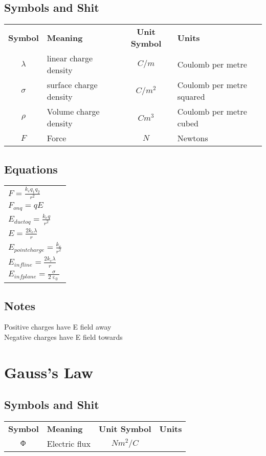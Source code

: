 \documentclass[12pt, letterpaper, twoside]{article}
\begin{document}
  \subsection*{Symbols and Shit}
    \begin{tabular}{c l c l}
  	  \textbf{Symbol} & \textbf{Meaning} & \textbf{Unit Symbol} & \textbf{Units}\\
  	  $\lambda$ & linear charge density & $C/m$ & Coulomb per metre\\
  	  $\sigma$ & surface charge density & $C/m^2$ & Coulomb per metre squared\\
  	  $\rho$ & Volume charge density & $Cm^3$ & Coulomb per metre cubed\\
  	  $F$ & Force & $N$ & Newtons\\
    \end{tabular}
  
  \subsection*{Equations}
    \begin{tabular}{l}
      $F = \frac{k_e q_1 q_2}{r^2}$\\
      $F_{on q} = qE$\\
      $E_{due to q} = \frac{k_e q}{r^2}$\\
      $E = \frac{2k_e \lambda}{r}$\\
      $E_{point charge} = \frac{k_e}{r^2}$\\
      $E_{inf line} = \frac{2k_e \lambda}{r}$\\
      $E_{inf plane} = \frac{\sigma}{2 \upepsilon_0}$\\
    \end{tabular}
  
  \subsection*{Notes}
    Positive charges have E field away\\
    Negative charges have E field towards\\
    
    
    
\section{Gauss's Law}
  \subsection*{Symbols and Shit}
    \begin{tabular}{c l c l}
  	  \textbf{Symbol} & \textbf{Meaning} & \textbf{Unit Symbol} & \textbf{Units}\\
  	  $\Upphi$ & Electric flux & $Nm^2/C$ & \\
  	  
    \end{tabular}
  
\end{document}
